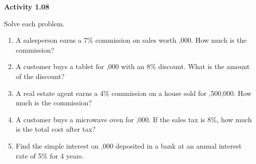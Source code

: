 \vspace{0.3ex}
\noindent\textbf{Activity 1.08}

\vspace{0.2ex}

Solve each problem.
\begin{enumerate}
    \item A salesperson earns a 7\% commission on sales worth ,000. How much is the commission?
    \item A customer buys a tablet for ,000 with an 8\% discount. What is the amount of the discount?
    \item A real estate agent earns a 4\% commission on a house sold for ,500,000. How much is the commission?
    \item A customer buys a microwave oven for ,000. If the sales tax is 8\%, how much is the total cost after tax?
    \item Find the simple interest on ,000 deposited in a bank at an annual interest rate of 5\% for 4 years.
\end{enumerate}
